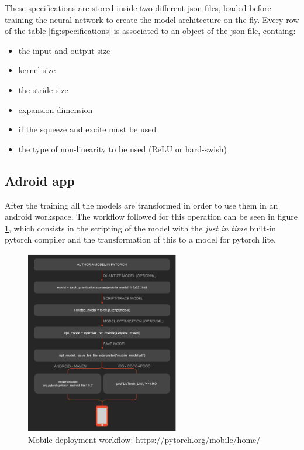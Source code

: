 \documentclass[12pt, letterpaper, twoside]{article}
\begin{document}
These specifications are stored inside two different json files, loaded before training the neural network to create the model architecture on the fly. Every row of the table \ref{fig:specifications} is associated to an object of the json file, containg:
\begin{itemize}
	\item the input and output size
	\item kernel size
	\item the stride size
	\item expansion dimension
	\item if the squeeze and excite must be used
	\item the type of non-linearity to be used (ReLU or hard-swish)
\end{itemize}

\subsection{Adroid app}
After the training all the models are transformed in order to use them in an android workspace. The workflow followed for this operation can be seen in figure \ref{fig:pytorch_mobile}, which consists in the scripting of the model with the \textit{just in time} built-in pytorch compiler and the transformation of this to a model for pytorch lite.

\begin{figure}[H]
	\centering
	\includegraphics[width=0.6\textwidth]{pytorch-mobile.png}
	\caption{Mobile deployment workflow: https://pytorch.org/mobile/home/}
	\label{fig:pytorch_mobile}
\end{figure}
\end{document}

